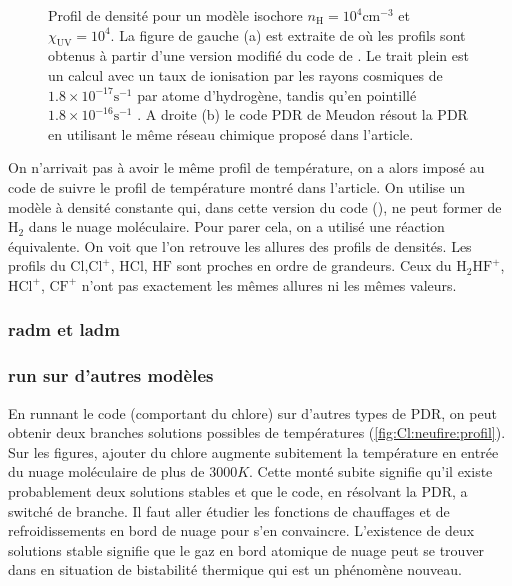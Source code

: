 \begin{figure}[!htbp]
    \caption{Profil de densité pour un modèle isochore $n_\mathrm{H} = 10^4 \mathrm{cm}^{-3}$ et $\chi_\mathrm{UV} = 10^4$. La figure de gauche (a) est extraite de \cite{Neufire2009} où les profils sont obtenus à partir d'une version modifié du code de \cite{Kaufman2006}. Le trait plein est un calcul avec un taux de ionisation par les rayons cosmiques de $1.8 \times 10^{−17 } \mathrm{s}^{-1}$ par atome d'hydrogène, tandis qu'en pointillé $1.8 \times 10^{−16} \mathrm{s}^{-1}$ . A droite (b) le code PDR de Meudon résout la PDR en utilisant le même réseau chimique proposé dans l'article.}
    \label{fig:Cl:neufire}
\end{figure}

On n'arrivait pas à avoir le même profil de température, on a alors imposé au code de suivre le profil de température montré dans l'article. On utilise un modèle à densité constante qui, dans cette version du code (\uncinq), ne peut former de $\mathrm{H}_2$ dans le nuage moléculaire. Pour parer cela, on a utilisé une réaction équivalente. On voit que l'on retrouve les allures des profils de densités. Les profils du $\mathrm{Cl}$,$\mathrm{Cl}^+$, $\mathrm{HCl}$, $\mathrm{HF}$ sont proches en ordre de grandeurs. Ceux du $\mathrm{H}_2\mathrm{HF}^+$, $\mathrm{HCl}^+$, $\mathrm{CF}^+$ n'ont pas exactement les mêmes allures ni les mêmes valeurs. 

\subsubsection{radm et ladm}

\subsubsection{run sur d'autres modèles}

En runnant le code (comportant du chlore) sur d'autres types de PDR, on peut obtenir deux branches solutions possibles de températures (\ref{fig:Cl:neufire:profil}). Sur les figures, ajouter du chlore augmente subitement la température en entrée du nuage moléculaire de plus de $3000K$. Cette monté subite signifie qu'il existe probablement deux solutions stables et que le code, en résolvant la PDR, a switché de branche. Il faut aller étudier les fonctions de chauffages et de refroidissements en bord de nuage pour s'en convaincre. L'existence de deux solutions stable signifie que le gaz en bord atomique de nuage peut se trouver dans en situation de bistabilité thermique qui est un phénomène nouveau.  


